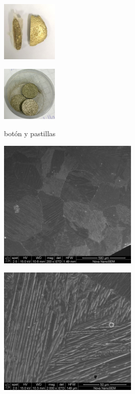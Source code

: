 \documentclass[usenames,dvipsnames]{beamer}
\begin{document}
\begin{frame}
\begin{multicols}{3}
\includegraphics[width=0.2\textwidth]{img/proceso/boton.jpg}

\includegraphics[width=0.2\textwidth]{img/proceso/PastViruta.jpg}
\end{multicols}


 \end{frame}

\begin{frame}
 \begin{center}

botón y pastillas
  \end{center}
\end{frame}







\begin{frame}

\begin{multicols}{2}

\includegraphics[width=0.5\textwidth]{img/tamgrano/L1B1_016.jpg}

\includegraphics[width=0.5\textwidth]{img/tamgrano/L1B1_014.jpg}
 
\end{multicols}
\end{frame}
\end{document}
